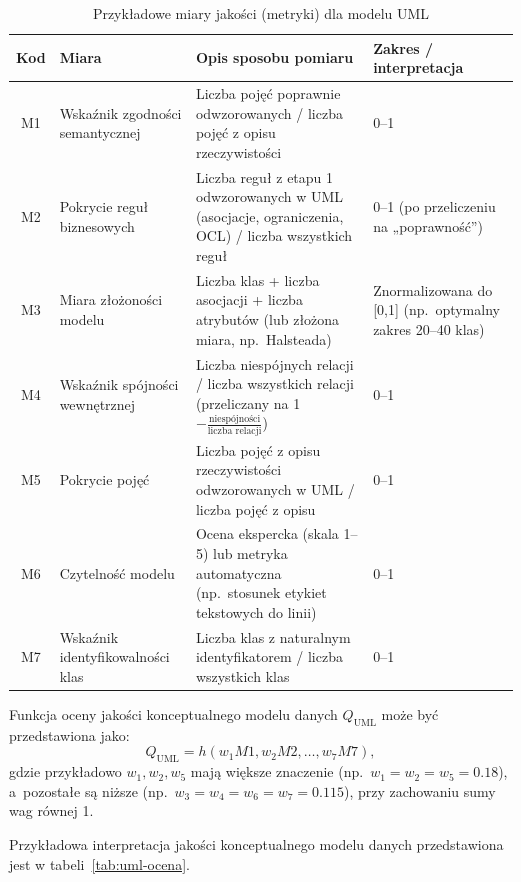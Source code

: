 \begin{table}[!ht]
  \centering
  \caption{Przykładowe miary jakości (metryki) dla modelu UML}
  \label{tab:uml-metryki}
  \scriptsize
  \begin{tabularx}{\textwidth}{cLp{4.5cm}p{3.5cm}}
    \toprule
    \textbf{Kod} & \textbf{Miara} & \textbf{Opis sposobu pomiaru} & \textbf{Zakres / interpretacja} \\
    \midrule
    M1 &
    Wskaźnik zgodności semantycznej &
    Liczba pojęć poprawnie odwzorowanych / liczba pojęć z opisu rzeczywistości &
    0--1 \\
    M2 &
    Pokrycie reguł biznesowych &
    Liczba reguł z etapu 1 odwzorowanych w UML (asocjacje, ograniczenia, OCL) / liczba wszystkich reguł &
    0--1 (po przeliczeniu na „poprawność”) \\
    M3 &
    Miara złożoności modelu &
    Liczba klas + liczba asocjacji + liczba atrybutów (lub złożona miara, np.\ Halsteada) &
    Znormalizowana do [0,1] (np.\ optymalny zakres 20--40 klas) \\
    M4 &
    Wskaźnik spójności wewnętrznej &
    Liczba niespójnych relacji / liczba wszystkich relacji (przeliczany na 1$-\frac{\text{niespójności}}{\text{liczba relacji}}$) &
    0--1 \\
    M5 &
    Pokrycie pojęć &
    Liczba pojęć z opisu rzeczywistości odwzorowanych w UML / liczba pojęć z opisu &
    0--1 \\
    M6 &
    Czytelność modelu &
    Ocena ekspercka (skala 1--5) lub metryka automatyczna (np.\ stosunek etykiet tekstowych do linii) &
    0--1 \\
    M7 &
    Wskaźnik identyfikowalności klas &
    Liczba klas z naturalnym identyfikatorem / liczba wszystkich klas &
    0--1 \\
    \bottomrule
  \end{tabularx}
\end{table}


Funkcja oceny jakości konceptualnego modelu danych $Q_{\mathrm{UML}}$ może być przedstawiona jako:
\begin{equation}
  Q_{\mathrm{UML}} = h(w_1 M1, w_2 M2, \dots, w_7 M7),
\end{equation}
gdzie przykładowo $w_1, w_2, w_5$ mają większe znaczenie (np.\ $w_1 = w_2 = w_5 = 0{.}18$), a~pozostałe są niższe (np.\ $w_3 = w_4 = w_6 = w_7 = 0{.}115$), przy zachowaniu sumy wag równej 1.

Przykładowa interpretacja jakości konceptualnego modelu danych przedstawiona jest w tabeli~\ref{tab:uml-ocena}.

